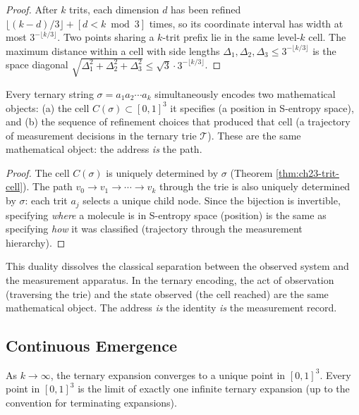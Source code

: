 \begin{proof}
After $k$ trits, each dimension $d$ has been refined $\lfloor (k - d)/3
\rfloor + [d < k \bmod 3]$ times, so its coordinate interval has width at
most $3^{-\lfloor k/3 \rfloor}$.  Two points sharing a $k$-trit prefix
lie in the same level-$k$ cell.  The maximum distance within a cell with
side lengths $\Delta_1, \Delta_2, \Delta_3 \leq 3^{-\lfloor k/3 \rfloor}$
is the space diagonal $\sqrt{\Delta_1^2 + \Delta_2^2 + \Delta_3^2} \leq
\sqrt{3} \cdot 3^{-\lfloor k/3 \rfloor}$.
\end{proof}

\begin{theorem}
\label{thm:ch23-duality}
Every ternary string $\sigma = a_1 a_2 \cdots a_k$ simultaneously encodes two
mathematical objects: (a) the cell $C(\sigma) \subset [0,1]^3$ it specifies
(a position in S-entropy space), and (b) the sequence of refinement choices
that produced that cell (a trajectory of measurement decisions in the ternary
trie $\mathcal{T}$).  These are the same mathematical object: the address
\emph{is} the path.
\end{theorem}

\begin{proof}
The cell $C(\sigma)$ is uniquely determined by $\sigma$ (Theorem
\ref{thm:ch23-trit-cell}).  The path $v_0 \to v_1 \to \cdots \to v_k$ through
the trie is also uniquely determined by $\sigma$: each trit $a_j$ selects a
unique child node.  Since the bijection is invertible, specifying
\emph{where} a molecule is in S-entropy space (position) is the same as
specifying \emph{how} it was classified (trajectory through the measurement
hierarchy).
\end{proof}

\begin{remark}
This duality dissolves the classical separation between the observed system and
the measurement apparatus.  In the ternary encoding, the act of observation
(traversing the trie) and the state observed (the cell reached) are the same
mathematical object.  The address \emph{is} the identity \emph{is} the
measurement record.
\end{remark}

\subsection{Continuous Emergence}
\label{sec:ch23-emergence}

\begin{theorem}
\label{thm:ch23-convergence}
As $k \to \infty$, the ternary expansion converges to a unique point
in $[0,1]^3$.  Every point in $[0,1]^3$ is the limit of exactly one infinite
ternary expansion (up to the convention for terminating expansions).
\end{theorem}

